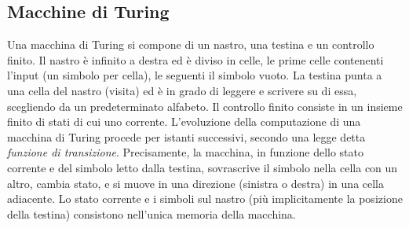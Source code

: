 \subsection{Macchine di Turing}
Una macchina di Turing si compone di un nastro, una testina e un controllo finito. Il nastro è infinito a destra ed è diviso in celle, le prime celle contenenti l'input (un simbolo per cella), le seguenti il simbolo vuoto. La testina punta a una cella del nastro (visita) ed è in grado di leggere e scrivere su di essa, scegliendo da un predeterminato alfabeto. Il controllo finito consiste in un insieme finito di stati di cui uno corrente. L'evoluzione della computazione di una macchina di Turing procede per istanti successivi, secondo una legge detta \emph{funzione di transizione}. Precisamente, la macchina, in funzione dello stato corrente e del simbolo letto dalla testina, sovrascrive il simbolo nella cella con un altro, cambia stato, e si muove in una direzione (sinistra o destra) in una cella adiacente. Lo stato corrente e i simboli sul nastro (più implicitamente la posizione della testina) consistono nell'unica memoria della macchina.

